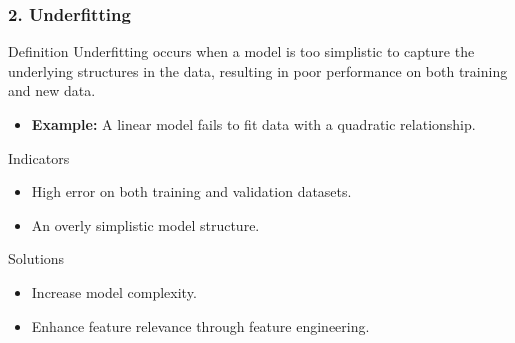 \documentclass[aspectratio=169]{beamer}
\begin{document}
\begin{frame}
    \frametitle{2. Underfitting}
    \begin{block}{Definition}
        Underfitting occurs when a model is too simplistic to capture the underlying structures in the data, resulting in poor performance on both training and new data.
    \end{block}
    \begin{itemize}
        \item \textbf{Example:} A linear model fails to fit data with a quadratic relationship.
    \end{itemize}
    
    \begin{block}{Indicators}
        \begin{itemize}
            \item High error on both training and validation datasets.
            \item An overly simplistic model structure.
        \end{itemize}
    \end{block}

    \begin{block}{Solutions}
        \begin{itemize}
            \item Increase model complexity.
            \item Enhance feature relevance through feature engineering.
        \end{itemize}
    \end{block}
\end{frame}
\end{document}
